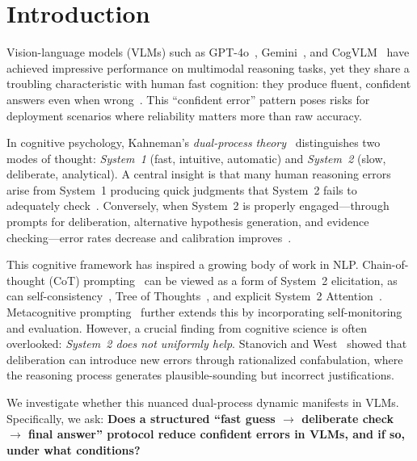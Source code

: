 \documentclass{cvpr}
\begin{document}
\section{Introduction}

Vision-language models (VLMs) such as GPT-4o~\cite{liu2023visual}, Gemini~\cite{yue2023mmmu}, and CogVLM~\cite{wang2023cogvlm} have achieved impressive performance on multimodal reasoning tasks, yet they share a troubling characteristic with human fast cognition: they produce fluent, confident answers even when wrong~\cite{groot2024overconfidence,xiong2024can}. This ``confident error'' pattern poses risks for deployment scenarios where reliability matters more than raw accuracy.

In cognitive psychology, Kahneman's \emph{dual-process theory}~\cite{kahneman2011thinking} distinguishes two modes of thought: \emph{System~1} (fast, intuitive, automatic) and \emph{System~2} (slow, deliberate, analytical). A central insight is that many human reasoning errors arise from System~1 producing quick judgments that System~2 fails to adequately check~\cite{evans2013dual,stanovich2000individual}. Conversely, when System~2 is properly engaged---through prompts for deliberation, alternative hypothesis generation, and evidence checking---error rates decrease and calibration improves~\cite{sloman1996empirical,evans2008dual}.

This cognitive framework has inspired a growing body of work in NLP. Chain-of-thought (CoT) prompting~\cite{wei2022chain,kojima2022large} can be viewed as a form of System~2 elicitation, as can self-consistency~\cite{wang2023selfconsistency}, Tree of Thoughts~\cite{yao2023tree}, and explicit System~2 Attention~\cite{weston2023system2attention}. Metacognitive prompting~\cite{wang2024metacognitive} further extends this by incorporating self-monitoring and evaluation. However, a crucial finding from cognitive science is often overlooked: \emph{System~2 does not uniformly help}. Stanovich and West~\cite{stanovich2000individual} showed that deliberation can introduce new errors through rationalized confabulation, where the reasoning process generates plausible-sounding but incorrect justifications.

We investigate whether this nuanced dual-process dynamic manifests in VLMs. Specifically, we ask: \textbf{Does a structured ``fast guess $\rightarrow$ deliberate check $\rightarrow$ final answer'' protocol reduce confident errors in VLMs, and if so, under what conditions?}
\end{document}
